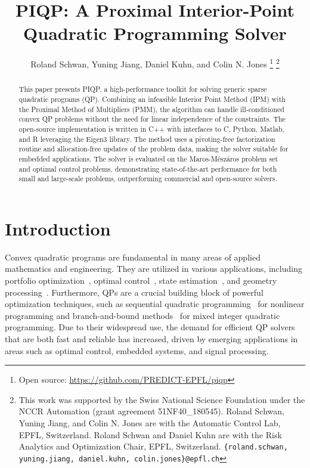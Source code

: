\documentclass[letterpaper, 10 pt, conference]{ieeeconf}  \IEEEoverridecommandlockouts
\title{\LARGE \bf
PIQP: A Proximal Interior-Point Quadratic Programming Solver
}
\author{Roland Schwan, Yuning Jiang, Daniel Kuhn, and Colin N. Jones
\thanks{Open source: \url{https://github.com/PREDICT-EPFL/piqp}}%
\thanks{This work was supported by the Swiss National Science Foundation under the NCCR Automation (grant agreement 51NF40\_180545).
Roland Schwan, Yuning Jiang, and Colin N. Jones are with the Automatic Control Lab, EPFL, Switzerland. Roland Schwan and Daniel Kuhn are with the Risk Analytics and Optimization Chair, EPFL, Switzerland. \tt{\{roland.schwan, yuning.jiang, daniel.kuhn, colin.jones\}@epfl.ch}}
}%
\begin{document}
\maketitle
\setlength\abovedisplayskip{4pt}
\setlength\belowdisplayskip{4pt}


\begin{abstract}
This paper presents PIQP, a high-performance toolkit for solving generic sparse quadratic programs (QP). Combining an infeasible Interior Point Method (IPM) with the Proximal Method of Multipliers (PMM), the algorithm can handle ill-conditioned convex QP problems without the need for linear independence of the constraints. The open-source implementation is written in C++ with interfaces to C, Python, Matlab, and R leveraging the Eigen3 library. The method uses a pivoting-free factorization routine and allocation-free updates of the problem data, making the solver suitable for embedded applications. The solver is evaluated on the Maros-Mészáros problem set and optimal control problems, demonstrating state-of-the-art performance for both small and large-scale problems, outperforming commercial and open-source solvers.
\end{abstract}

\section{Introduction}
Convex quadratic programs are fundamental in many areas of applied mathematics and engineering. They are utilized in various applications, including portfolio optimization~\cite{rubinstein2002markowitz}, optimal control~\cite{rawlings2017model}, state estimation~\cite{allgower1999nonlinear}, and geometry processing~\cite{zhu2018blended}. Furthermore, QPs are a crucial building block of powerful optimization techniques, such as sequential quadratic programming~\cite{boggs1995sequential} for nonlinear programming and branch-and-bound methods~\cite{fletcher1998numerical} for mixed integer quadratic programming. Due to their widespread use, the demand for efficient QP solvers that are both fast and reliable has increased, driven by emerging applications in areas such as optimal control, embedded systems, and signal processing.
\end{document}
